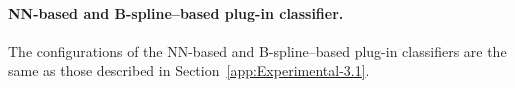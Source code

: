 \documentclass{article}
\theoremstyle{plain}
\theoremstyle{definition}
\theoremstyle{remark}
\begin{document}








\paragraph{NN-based and B-spline–based plug-in classifier.}

The configurations of the NN-based and B-spline–based plug-in classifiers are the same as those described in Section~\ref{app:Experimental-3.1}.  %





\end{document}
